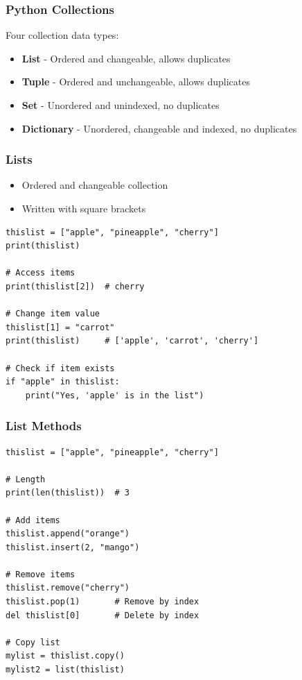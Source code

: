 \documentclass[aspectratio=169]{beamer}
\begin{document}
\begin{frame}
\frametitle{Python Collections}
Four collection data types:
\begin{itemize}
\item \textbf{List} - Ordered and changeable, allows duplicates
\item \textbf{Tuple} - Ordered and unchangeable, allows duplicates
\item \textbf{Set} - Unordered and unindexed, no duplicates
\item \textbf{Dictionary} - Unordered, changeable and indexed, no duplicates
\end{itemize}
\end{frame}

\begin{frame}[fragile]
\frametitle{Lists}
\begin{itemize}
\item Ordered and changeable collection
\item Written with square brackets
\end{itemize}

\begin{lstlisting}
thislist = ["apple", "pineapple", "cherry"]
print(thislist)

# Access items
print(thislist[2])  # cherry

# Change item value
thislist[1] = "carrot"
print(thislist)     # ['apple', 'carrot', 'cherry']

# Check if item exists
if "apple" in thislist:
    print("Yes, 'apple' is in the list")
\end{lstlisting}
\end{frame}

\begin{frame}[fragile]
\frametitle{List Methods}
\begin{lstlisting}
thislist = ["apple", "pineapple", "cherry"]

# Length
print(len(thislist))  # 3

# Add items
thislist.append("orange")
thislist.insert(2, "mango")

# Remove items
thislist.remove("cherry")
thislist.pop(1)       # Remove by index
del thislist[0]       # Delete by index

# Copy list
mylist = thislist.copy()
mylist2 = list(thislist)
\end{lstlisting}
\end{frame}
\end{document}
